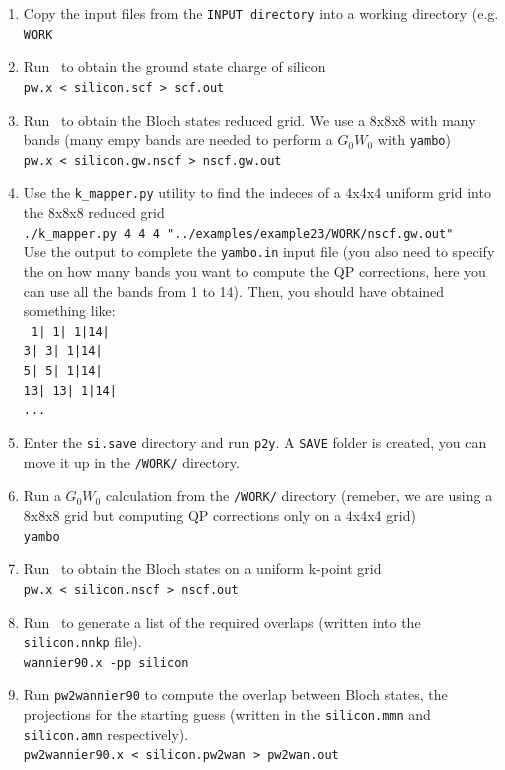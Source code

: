 \documentclass[a4paper,11pt,twoside]{article}
\begin{document}
\begin{enumerate}
\item Copy the input files from the {\tt INPUT directory} into a working directory (e.g. {\tt WORK}
\item Run \pwscf\ to obtain the ground state charge of silicon \\
{\tt pw.x < silicon.scf > scf.out}
\item Run \pwscf\ to obtain the Bloch states reduced grid. We use a 8x8x8 with many bands (many empy bands are needed to perform a $G_0W_0$ with {\tt yambo})\\
{\tt pw.x < silicon.gw.nscf > nscf.gw.out}
\item Use the {\tt k\_mapper.py} utility to find the indeces of a 4x4x4 uniform grid into the 8x8x8 reduced grid \\
{\tt ./k\_mapper.py 4 4 4 "../examples/example23/WORK/nscf.gw.out"}\\
Use the output to complete the {\tt yambo.in} input file (you also need to specify the on how many bands you want to compute the QP corrections, here you can use all the bands from 1 to 14). Then, you should have obtained something like:\\
 {\tt 
1| 1|  1|14| \\
3| 3|  1|14| \\ 
5| 5|  1|14| \\ 
13| 13|  1|14| \\
...\tt}
\item Enter the {\tt si.save} directory and run {\tt p2y}. A {\tt SAVE} folder is created, you can move it up in the {\tt /WORK/} directory.\\
\item Run a $G_0W_0$ calculation from the {\tt /WORK/} directory (remeber, we are using a 8x8x8 grid but computing QP corrections only on a 4x4x4 grid)\\
{\tt yambo }


\item Run \pwscf\ to obtain the Bloch states on a uniform k-point grid\\
{\tt pw.x < silicon.nscf > nscf.out}

\item Run \wannier\ to generate a list of the required overlaps (written
  into the {\tt silicon.nnkp} file).\\ 
{\tt wannier90.x -pp silicon}

\item Run {\tt pw2wannier90} to compute the overlap between Bloch
  states, the projections for the starting guess (written in the
  {\tt silicon.mmn} and {\tt silicon.amn} respectively).\\  
{\tt pw2wannier90.x < silicon.pw2wan > pw2wan.out}


\end{enumerate}
\end{document}

